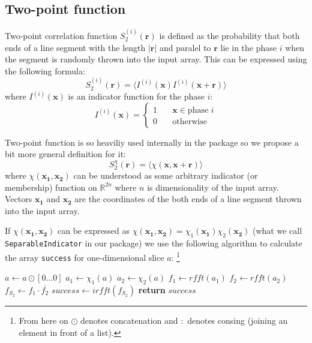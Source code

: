 \documentclass[reprint,amsmath,amssymb,aps,pre,nofootinbib]{revtex4-1}
\newcommand{\code}[1]{\colorbox{light-gray}{\texttt{#1}}}
\begin{document}
\subsection{Two-point function}
\label{sec:s2}
Two-point correlation function $S_2^{(i)}(\bm{r})$ is defined as the probability
that both ends of a line segment with the length $|\bm{r}|$ and paralel to
$\bm{r}$ lie in the phase $i$ when the segment is randomly thrown into the input
array. This can be expressed using the following formula:
\begin{equation*}
  S_2^{(i)}(\bm{r}) = \langle I^{(i)}(\bm{x}) I^{(i)}(\bm{x} + \bm{r}) \rangle
\end{equation*}
where $I^{(i)}(\bm{x})$ is an indicator function for the phase $i$:
\begin{equation*}
I^{(i)}(\bm{x}) = \left\{
\begin{array}{ll}
  1 & \quad \bm{x} \in \text{phase $i$} \\
  0 & \quad \text{otherwise}
\end{array}
\right.
\end{equation*}

Two-point function is so heaviliy used internally in the package so we propose a
bit more general definition for it:
\begin{equation}
  S_2^{\chi}(\bm{r}) = \langle \chi(\bm{x}, \bm{x} + \bm{r}) \rangle
  \label{eq:s2gen}
\end{equation}
where $\chi(\bm{x_1}, \bm{x_2})$ can be understood as some arbitrary indicator
(or membership) function on $\mathbb{R}^{2n}$ where $n$ is dimensionality of the
input array. Vectors $\bm{x_1}$ and $\bm{x_2}$ are the coordinates of the both
ends of a line segment thrown into the input array.

If $\chi(\bm{x_1}, \bm{x_2})$ can be expressed as
$\chi(\bm{x_1}, \bm{x_2}) = \chi_1(\bm{x_1})\chi_2(\bm{x_2})$ (what we call
\code{SeparableIndicator} in our package) we use the following algorithm to
calculate the array \code{success} for one-dimensional slice $a$: \footnote{From
here on $\odot$ denotes concatenation and $:$ denotes consing (joining an
element in front of a list).}
\begin{algorithmic}[1]
    \State $a \gets a \odot [0 \dots 0]$ 
  \EndIf
  \State $a_1 \gets \chi_1(a)$ 
  \State $a_2 \gets \chi_2(a)$ 
  \State $f_1 \gets rfft(a_1)$ 
  \State $f_2 \gets rfft(a_2)$
  \State $f_{S_2} \gets f_1 \cdot \overline{f_2}$ 
  \State $success \gets irfft(f_{S_2})$ 
  \State \textbf{return} $success$
  \EndProcedure
\end{algorithmic}
\end{document}
